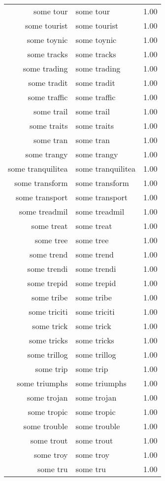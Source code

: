 \begin{table}[ht]
\begin{tabular}{rlr}
  some tour & some tour & 1.00 \\ 
  some tourist & some tourist & 1.00 \\ 
  some toynic & some toynic & 1.00 \\ 
  some tracks & some tracks & 1.00 \\ 
  some trading & some trading & 1.00 \\ 
  some tradit & some tradit & 1.00 \\ 
  some traffic & some traffic & 1.00 \\ 
  some trail & some trail & 1.00 \\ 
  some traits & some traits & 1.00 \\ 
  some tran & some tran & 1.00 \\ 
  some trangy & some trangy & 1.00 \\ 
  some tranquilitea & some tranquilitea & 1.00 \\ 
  some transform & some transform & 1.00 \\ 
  some transport & some transport & 1.00 \\ 
  some treadmil & some treadmil & 1.00 \\ 
  some treat & some treat & 1.00 \\ 
  some tree & some tree & 1.00 \\ 
  some trend & some trend & 1.00 \\ 
  some trendi & some trendi & 1.00 \\ 
  some trepid & some trepid & 1.00 \\ 
  some tribe & some tribe & 1.00 \\ 
  some triciti & some triciti & 1.00 \\ 
  some trick & some trick & 1.00 \\ 
  some tricks & some tricks & 1.00 \\ 
  some trillog & some trillog & 1.00 \\ 
  some trip & some trip & 1.00 \\ 
  some triumphs & some triumphs & 1.00 \\ 
  some trojan & some trojan & 1.00 \\ 
  some tropic & some tropic & 1.00 \\ 
  some trouble & some trouble & 1.00 \\ 
  some trout & some trout & 1.00 \\ 
  some troy & some troy & 1.00 \\ 
  some tru & some tru & 1.00 \\ 

\end{tabular}
\end{table}

